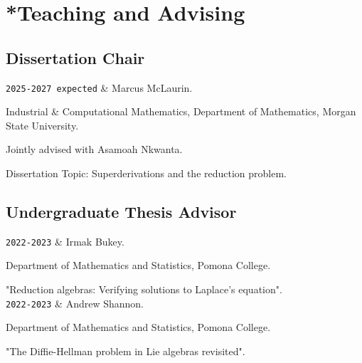 \documentclass[11pt]{article}
\newcommand{\MSU}{Morgan State University}
\newcommand{\Pomona}{Pomona College}
\newcommand{\ICM}{Industrial \& Computational Mathematics}
\newcommand{\Duration}[2]{\fontsize{10pt}{0}\selectfont \texttt{#1-#2}}
\begin{document}
\section{*Teaching and Advising}
    \subsection{Dissertation Chair}
\begin{EntriesTableDuration}
\Duration{2025}{2027 expected} & Marcus McLaurin.

\ICM, Department of Mathematics, \MSU.

Jointly advised with Asamoah Nkwanta.

Dissertation Topic: Superderivations and the reduction problem.

\end{EntriesTableDuration}
    \subsection{Undergraduate Thesis Advisor}

\begin{EntriesTableDuration}

\Duration{2022}{2023} & Irmak Bukey.

Department of Mathematics and Statistics, \Pomona.

"Reduction algebras: Verifying solutions to Laplace's equation".\\

\Duration{2022}{2023} & Andrew Shannon.

Department of Mathematics and Statistics, \Pomona.

"The Diffie-Hellman problem in Lie algebras revisited".

\end{EntriesTableDuration}
\end{document}
